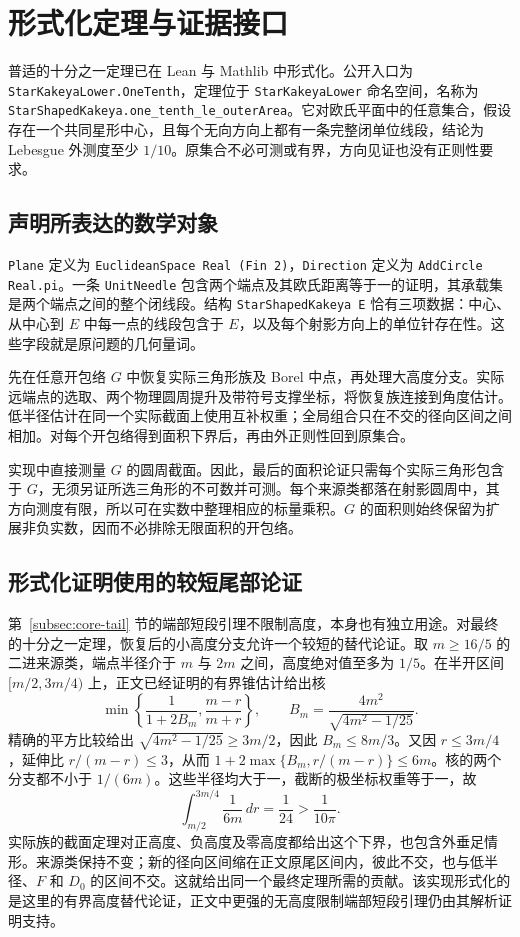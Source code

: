 \section{形式化定理与证据接口}\label{sec:formal-evidence}
普适的十分之一定理已在 Lean 与 Mathlib 中形式化。公开入口为 \nolinkurl{StarKakeyaLower.OneTenth}，定理位于 \texttt{StarKakeyaLower} 命名空间，名称为 \nolinkurl{StarShapedKakeya.one_tenth_le_outerArea}。它对欧氏平面中的任意集合，假设存在一个共同星形中心，且每个无向方向上都有一条完整闭单位线段，结论为 Lebesgue 外测度至少 $1/10$。原集合不必可测或有界，方向见证也没有正则性要求。

\subsection{声明所表达的数学对象}
\texttt{Plane} 定义为 \texttt{EuclideanSpace Real (Fin 2)}，\texttt{Direction} 定义为 \texttt{AddCircle Real.pi}。一条 \texttt{UnitNeedle} 包含两个端点及其欧氏距离等于一的证明，其承载集是两个端点之间的整个闭线段。结构 \texttt{StarShapedKakeya E} 恰有三项数据：中心、从中心到 $E$ 中每一点的线段包含于 $E$，以及每个射影方向上的单位针存在性。这些字段就是原问题的几何量词。

先在任意开包络 $G$ 中恢复实际三角形族及 Borel 中点，再处理大高度分支。实际远端点的选取、两个物理圆周提升及带符号支撑坐标，将恢复族连接到角度估计。低半径估计在同一个实际截面上使用互补权重；全局组合只在不交的径向区间之间相加。对每个开包络得到面积下界后，再由外正则性回到原集合。

实现中直接测量 $G$ 的圆周截面。因此，最后的面积论证只需每个实际三角形包含于 $G$，无须另证所选三角形的不可数并可测。每个来源类都落在射影圆周中，其方向测度有限，所以可在实数中整理相应的标量乘积。$G$ 的面积则始终保留为扩展非负实数，因而不必排除无限面积的开包络。

\subsection{形式化证明使用的较短尾部论证}
第~\ref{subsec:core-tail} 节的端部短段引理不限制高度，本身也有独立用途。对最终的十分之一定理，恢复后的小高度分支允许一个较短的替代论证。取 $m\ge16/5$ 的二进来源类，端点半径介于 $m$ 与 $2m$ 之间，高度绝对值至多为 $1/5$。在半开区间 $[m/2,3m/4)$ 上，正文已经证明的有界锥估计给出核
\[
 \min\left\{\frac1{1+2B_m},\frac{m-r}{m+r}\right\},
 \qquad B_m=\frac{4m^2}{\sqrt{4m^2-1/25}}.
\]
精确的平方比较给出 $\sqrt{4m^2-1/25}\ge3m/2$，因此 $B_m\le8m/3$。又因 $r\le3m/4$，延伸比 $r/(m-r)\le3$，从而 $1+2\max\{B_m,r/(m-r)\}\le6m$。核的两个分支都不小于 $1/(6m)$。这些半径均大于一，截断的极坐标权重等于一，故
\[
 \int_{m/2}^{3m/4}\frac1{6m}\,dr=\frac1{24}>\frac1{10\pi}.
\]
实际族的截面定理对正高度、负高度及零高度都给出这个下界，也包含外垂足情形。来源类保持不变；新的径向区间缩在正文原尾区间内，彼此不交，也与低半径、$F$ 和 $D_0$ 的区间不交。这就给出同一个最终定理所需的贡献。该实现形式化的是这里的有界高度替代论证，正文中更强的无高度限制端部短段引理仍由其解析证明支持。

